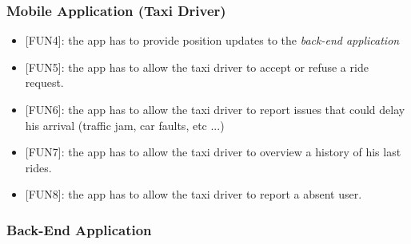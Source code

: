 \documentclass[12pt, a4paper]{article}
\begin{document}
\subsubsection{Mobile Application (Taxi Driver)} %
\label{ssub:mobile_application_}
\begin{itemize}
	\item {[FUN4\label{itm:FUN4}]}: the app has to provide position updates to the \emph{back-end application}
	\item {[FUN5\label{itm:FUN5}]}: the app has to allow the taxi driver to accept or refuse a ride request.
	\item {[FUN6\label{itm:FUN6}]}: the app has to allow the taxi driver to report issues that could delay his arrival (traffic jam, car faults, etc ...)
	\item {[FUN7\label{itm:FUN7}]}: the app has to allow the taxi driver to overview a history of his last rides.
	\item {[FUN8\label{itm:FUN8}]}: the app has to allow the taxi driver to report a absent user.
\end{itemize}

\subsubsection{Back-End Application} 
\label{ssub:back_end_application}
\end{document}
